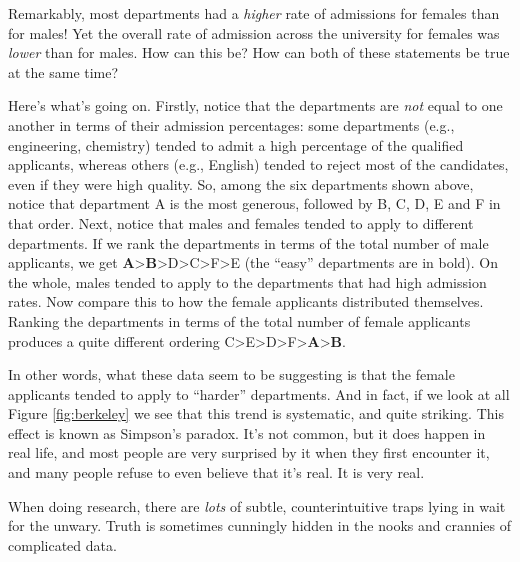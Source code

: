 \documentclass[
]{book}
\theoremstyle{definition}
\theoremstyle{definition}
\theoremstyle{definition}
\theoremstyle{definition}
\theoremstyle{remark}
\begin{document}
Remarkably, most departments had a \emph{higher} rate of admissions for females than for males! Yet the overall rate of admission across the university for females was \emph{lower} than for males. How can this be? How can both of these statements be true at the same time?

Here's what's going on. Firstly, notice that the departments are \emph{not} equal to one another in terms of their admission percentages: some departments (e.g., engineering, chemistry) tended to admit a high percentage of the qualified applicants, whereas others (e.g., English) tended to reject most of the candidates, even if they were high quality. So, among the six departments shown above, notice that department A is the most generous, followed by B, C, D, E and F in that order. Next, notice that males and females tended to apply to different departments. If we rank the departments in terms of the total number of male applicants, we get \textbf{A}\textgreater{}\textbf{B}\textgreater D\textgreater C\textgreater F\textgreater E (the ``easy'' departments are in bold). On the whole, males tended to apply to the departments that had high admission rates. Now compare this to how the female applicants distributed themselves. Ranking the departments in terms of the total number of female applicants produces a quite different ordering C\textgreater E\textgreater D\textgreater F\textgreater{}\textbf{A}\textgreater{}\textbf{B}.

In other words, what these data seem to be suggesting is that the female applicants tended to apply to ``harder'' departments. And in fact, if we look at all Figure \ref{fig:berkeley} we see that this trend is systematic, and quite striking. This effect is known as Simpson's paradox. It's not common, but it does happen in real life, and most people are very surprised by it when they first encounter it, and many people refuse to even believe that it's real. It is very real.

When doing research, there are \emph{lots} of subtle, counterintuitive traps lying in wait for the unwary. Truth is sometimes cunningly hidden in the nooks and crannies of complicated data.
\end{document}
